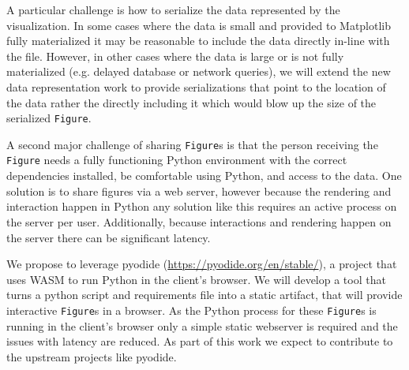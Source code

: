 \documentclass[12pt]{article}
\numberwithin{page}{section}
\begin{document}
A particular challenge is how to serialize the data represented by the
visualization.  In some cases where the data is small and provided to Matplotlib
fully materialized it may be reasonable to include the data directly in-line with
the file.  However, in other cases where the data is large or is not fully
materialized (e.g. delayed database or network queries),
we will extend the new data representation work to provide
serializations that point to the location of the data rather the directly
including it which would blow up the size of the serialized \texttt{Figure}.


A second major challenge of sharing \texttt{Figure}s is that the person
receiving the \texttt{Figure} needs a fully functioning Python environment with
the correct dependencies installed, be comfortable using Python, and access to
the data.  One solution is to share figures via a web server, however because
the rendering and interaction happen in Python any solution like this requires
an active process on the server per user.  Additionally, because interactions
and rendering happen on the server there can be significant latency.

We propose to leverage pyodide (\url{https://pyodide.org/en/stable/}), a
project that uses WASM to run Python in the client's browser.  We will develop a
tool that turns a python script and requirements file into a static artifact,
that will provide interactive \texttt{Figure}s in a browser.  As the
Python process for these \texttt{Figure}s is running in the client's browser
only a simple static webserver is required and the issues with latency are
reduced.  As part of this work we expect to contribute to the upstream
projects like pyodide.



\end{document}
